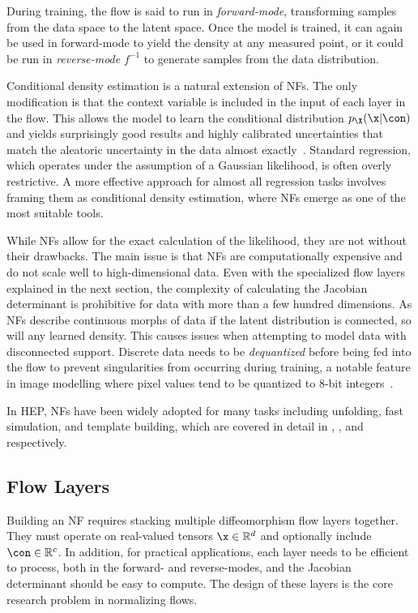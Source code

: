 During training, the flow is said to run in \textit{forward-mode}, transforming samples from the data space to the latent space.
Once the model is trained, it can again be used in forward-mode to yield the density at any measured point, or it could be run in \textit{reverse-mode} $f^{-1}$ to generate samples from the data distribution.

Conditional density estimation is a natural extension of NFs.
The only modification is that the context variable is included in the input of each layer in the flow.
This allows the model to learn the conditional distribution $p_{\X}(\x|\con)$ and yields surprisingly good results and highly calibrated uncertainties that match the aleatoric uncertainty in the data almost exactly~\cite{SolvingInverseProblems, InferenceAstrophysicalParameters, ComposingNormalizingFlows, NormalizingFlowsProbabilistic}.
Standard regression, which operates under the assumption of a Gaussian likelihood, is often overly restrictive.
A more effective approach for almost all regression tasks involves framing them as conditional density estimation, where NFs emerge as one of the most suitable tools.

While NFs allow for the exact calculation of the likelihood, they are not without their drawbacks.
The main issue is that NFs are computationally expensive and do not scale well to high-dimensional data.
Even with the specialized flow layers explained in the next section, the complexity of calculating the Jacobian determinant is prohibitive for data with more than a few hundred dimensions.
As NFs describe continuous morphs of data if the latent distribution is connected, so will any learned density.
This causes issues when attempting to model data with disconnected support.
Discrete data needs to be \textit{dequantized} before being fed into the flow to prevent singularities from occurring during training, a notable feature in image modelling where pixel values tend to be quantized to 8-bit integers~\cite{FlowImprovingFlowBased}.

In HEP, NFs have been widely adopted for many tasks including unfolding, fast simulation, and template building, which are covered in detail in , , and  respectively.

\subsection{Flow Layers}

Building an NF requires stacking multiple diffeomorphism flow layers together.
They must operate on real-valued tensors $\x \in \mathbb{R}^d$ and optionally include $\con \in \mathbb{R}^c$.
In addition, for practical applications, each layer needs to be efficient to process, both in the forward- and reverse-modes, and the Jacobian determinant should be easy to compute.
The design of these layers is the core research problem in normalizing flows.

